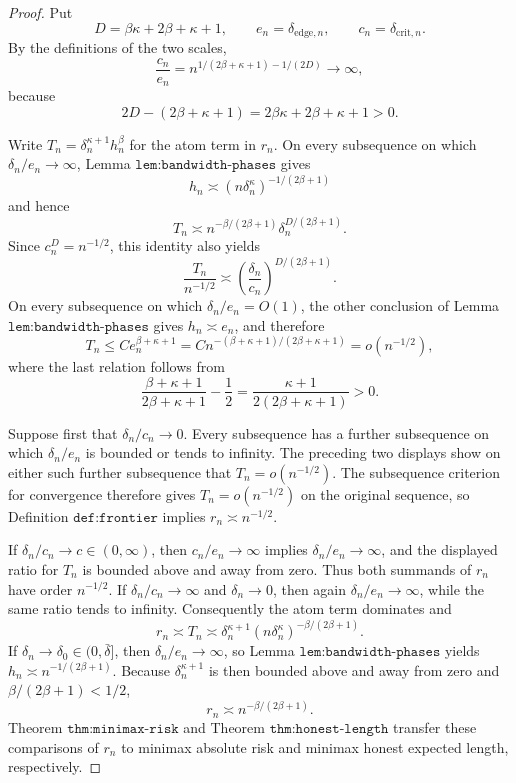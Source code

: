 \documentclass{article}
\begin{document}
\begin{proof}
Put
\[
 D=\beta\kappa+2\beta+\kappa+1,
 \qquad e_n=\delta_{\mathrm{edge},n},
 \qquad c_n=\delta_{\mathrm{crit},n}.
\]
By the definitions of the two scales,
\[
 \frac{c_n}{e_n}
 =n^{1/(2\beta+\kappa+1)-1/(2D)}\longrightarrow\infty,
\]
because
\[
 2D-(2\beta+\kappa+1)=2\beta\kappa+2\beta+\kappa+1>0.
\]

Write \(T_n=\delta_n^{\kappa+1}h_n^\beta\) for the atom term in \(r_n\).  On every subsequence on which \(\delta_n/e_n\to\infty\), Lemma \(\texttt{lem:bandwidth-phases}\) gives
\[
 h_n\asymp(n\delta_n^\kappa)^{-1/(2\beta+1)}
\]
and hence
\[
 T_n\asymp
 n^{-\beta/(2\beta+1)}
 \delta_n^{D/(2\beta+1)}.
\]
Since \(c_n^D=n^{-1/2}\), this identity also yields
\[
 \frac{T_n}{n^{-1/2}}
 \asymp
 \left(\frac{\delta_n}{c_n}\right)^{D/(2\beta+1)}.
\]
On every subsequence on which \(\delta_n/e_n=O(1)\), the other conclusion of Lemma \(\texttt{lem:bandwidth-phases}\) gives \(h_n\asymp e_n\), and therefore
\[
 T_n\leq C e_n^{\beta+\kappa+1}
 =C n^{-(\beta+\kappa+1)/(2\beta+\kappa+1)}
 =o(n^{-1/2}),
\]
where the last relation follows from
\[
 \frac{\beta+\kappa+1}{2\beta+\kappa+1}-\frac12
 =\frac{\kappa+1}{2(2\beta+\kappa+1)}>0.
\]

Suppose first that \(\delta_n/c_n\to0\).  Every subsequence has a further subsequence on which \(\delta_n/e_n\) is bounded or tends to infinity.  The preceding two displays show on either such further subsequence that \(T_n=o(n^{-1/2})\).  The subsequence criterion for convergence therefore gives \(T_n=o(n^{-1/2})\) on the original sequence, so Definition \(\texttt{def:frontier}\) implies \(r_n\asymp n^{-1/2}\).

If \(\delta_n/c_n\to c\in(0,\infty)\), then \(c_n/e_n\to\infty\) implies \(\delta_n/e_n\to\infty\), and the displayed ratio for \(T_n\) is bounded above and away from zero.  Thus both summands of \(r_n\) have order \(n^{-1/2}\).  If \(\delta_n/c_n\to\infty\) and \(\delta_n\to0\), then again \(\delta_n/e_n\to\infty\), while the same ratio tends to infinity.  Consequently the atom term dominates and
\[
 r_n\asymp T_n
 \asymp\delta_n^{\kappa+1}(n\delta_n^\kappa)^{-\beta/(2\beta+1)}.
\]
If \(\delta_n\to\delta_0\in(0,\bar\delta]\), then \(\delta_n/e_n\to\infty\), so Lemma \(\texttt{lem:bandwidth-phases}\) yields \(h_n\asymp n^{-1/(2\beta+1)}\).  Because \(\delta_n^{\kappa+1}\) is then bounded above and away from zero and \(\beta/(2\beta+1)<1/2\),
\[
 r_n\asymp n^{-\beta/(2\beta+1)}.
\]
Theorem \(\texttt{thm:minimax-risk}\) and Theorem \(\texttt{thm:honest-length}\) transfer these comparisons of \(r_n\) to minimax absolute risk and minimax honest expected length, respectively.


\end{proof}
\end{document}
